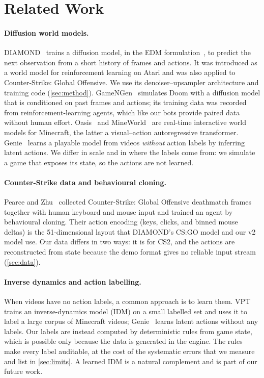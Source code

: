 \section{Related Work}
\label{sec:related}
\paragraph{Diffusion world models.}
DIAMOND~\cite{alonso2024diamond} trains a diffusion model, in the EDM formulation~\cite{karras2022edm}, to predict the next observation from a short history of frames and actions.
It was introduced as a world model for reinforcement learning on Atari and was also applied to Counter-Strike: Global Offensive.
We use its denoiser--upsampler architecture and training code (\cref{sec:method}).
GameNGen~\cite{valevski2025gamengen} simulates Doom with a diffusion model that is conditioned on past frames and actions; its training data was recorded from reinforcement-learning agents, which like our bots provide paired data without human effort.
Oasis~\cite{oasis2024} and MineWorld~\cite{guo2025mineworld} are real-time interactive world models for Minecraft, the latter a visual--action autoregressive transformer.
Genie~\cite{bruce2024genie} learns a playable model from videos \emph{without} action labels by inferring latent actions.
We differ in scale and in where the labels come from: we simulate a game that exposes its state, so the actions are not learned.

\paragraph{Counter-Strike data and behavioural cloning.}
Pearce and Zhu~\cite{pearce2021counterstrike} collected Counter-Strike: Global Offensive deathmatch frames together with human keyboard and mouse input and trained an agent by behavioural cloning.
Their action encoding (keys, clicks, and binned mouse deltas) is the 51-dimensional layout that DIAMOND's CS:GO model and our v2 model use.
Our data differs in two ways: it is for CS2, and the actions are reconstructed from state because the demo format gives no reliable input stream (\cref{sec:data}).

\paragraph{Inverse dynamics and action labelling.}
When videos have no action labels, a common approach is to learn them.
VPT~\cite{baker2022vpt} trains an inverse-dynamics model (IDM) on a small labelled set and uses it to label a large corpus of Minecraft videos; Genie~\cite{bruce2024genie} learns latent actions without any labels.
Our labels are instead computed by deterministic rules from game state, which is possible only because the data is generated in the engine.
The rules make every label auditable, at the cost of the systematic errors that we measure and list in \cref{sec:limits}.
A learned IDM is a natural complement and is part of our future work.
